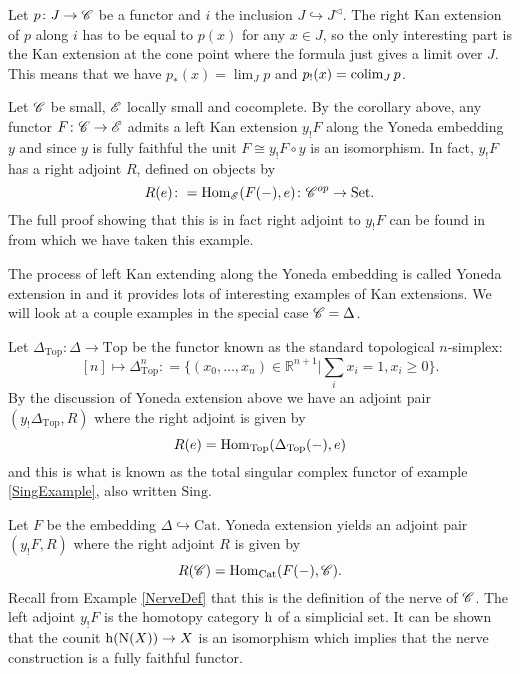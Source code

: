 \documentclass[../../thesis.tex]{subfiles}
\begin{document}
\begin{example}\label{KanCone}
    Let $ p \colon J \to \mathscr{C}$ be a functor and $i$ the inclusion $J \hookrightarrow J^{\triangleleft}$.
    The right Kan extension of $p$ along $i$ has to be equal to $p(x)$ for any $x \in J$, so the only interesting part is the Kan extension at the cone point where the formula just gives a limit over $J$.
    This means that we have $p_*(x) = \lim_J p$ and $p_!(x) = \operatorname{colim}_J p $.
\end{example}
\begin{example}
    Let $\mathscr{C}$ be small, $\mathscr{E}$ locally small and cocomplete.
    By the corollary above, any functor $F\colon \mathscr{C} \to \mathscr{E}$ admits a left Kan extension $y_!F$ along the Yoneda embedding $y$ and since $y$ is fully faithful the unit $F \cong y_!F\circ y$ is an isomorphism.
    In fact, $y_!F$ has a right adjoint $R$, defined on objects by
    \[
        R(e) \colon = \mathrm{Hom}_{\mathscr{E}}(F({-}), e) \colon \mathscr{C}^{op} \to \mathrm{Set}.
    \]
    The full proof showing that this is in fact right adjoint to $y_!F$ can be found in \cite[Remark 6.5.9.]{CatContext} from which we have taken this example.
\end{example}
The process of left Kan extending along the Yoneda embedding is called Yoneda extension in \cite[pp.62-64]{CatsSheaves} and it provides lots of interesting examples of Kan extensions.
We will look at a couple examples in the special case $\mathscr{C} = \Delta$.
\begin{example}
    Let $\Delta_{\mathrm{Top}} \colon \Delta \to \mathrm{Top}$ be the functor known as the standard topological $n$-simplex:
    \[
        [n] \mapsto \Delta^n_{\mathrm{Top}} : = \{(x_0, \dots , x_n) \in \mathbb{R}^{n+1} | \sum_{i}x_i = 1, x_i \geq 0\}  .
    \]
    By the discussion of Yoneda extension above we have an adjoint pair $(y_!\Delta_{\mathrm{Top}}, R)$ where the right adjoint is given by
    \[
        R(e) = \mathrm{Hom}_{\mathrm{Top}}(\Delta_{\mathrm{Top}}({-}), e)
    \]
    and this is what is known as the total singular complex functor of example \ref{SingExample}, also written $\mathrm{Sing}$.
\end{example}
\begin{example}\label{NerveKan}
    Let $F$ be the embedding $\Delta \hookrightarrow \mathrm{Cat}$.
    Yoneda extension yields an adjoint pair $(y_!F, R)$ where the right adjoint $R$ is given by
    \[
        R(\mathscr{C}) = \mathrm{Hom}_{\mathrm{Cat}}(F({-}), \mathscr{C}).
    \]
    Recall from Example \ref{NerveDef} that this is the definition of the nerve of $\mathscr{C}$.
    The left adjoint $y_!F$ is the homotopy category $\mathrm{h}$ of a simplicial set.
    It can be shown that the counit $\mathrm{h}(\mathrm{N}(X)) \to X$ is an isomorphism which implies that the nerve construction is a fully faithful functor.
\end{example}
\end{document}
